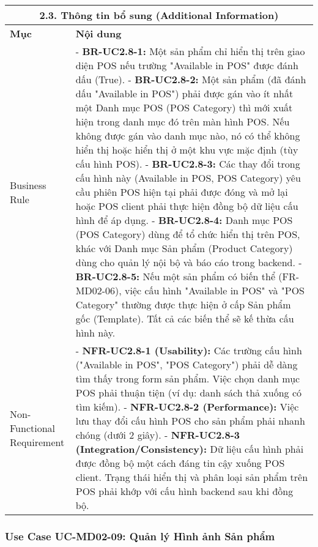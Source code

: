 \begin{longtable}{|m{4cm}|p{11cm}|}
\hline
\multicolumn{2}{|c|}{\textbf{2.3. Thông tin bổ sung (Additional Information)}} \\
\hline
\textbf{Mục} & \textbf{Nội dung} \\
\hline
Business Rule & - \textbf{BR-UC2.8-1:} Một sản phẩm chỉ hiển thị trên giao diện POS nếu trường "Available in POS" được đánh dấu (True). \newline - \textbf{BR-UC2.8-2:} Một sản phẩm (đã đánh dấu "Available in POS") phải được gán vào ít nhất một Danh mục POS (POS Category) thì mới xuất hiện trong danh mục đó trên màn hình POS. Nếu không được gán vào danh mục nào, nó có thể không hiển thị hoặc hiển thị ở một khu vực mặc định (tùy cấu hình POS). \newline - \textbf{BR-UC2.8-3:} Các thay đổi trong cấu hình này (Available in POS, POS Category) yêu cầu phiên POS hiện tại phải được đóng và mở lại hoặc POS client phải thực hiện đồng bộ dữ liệu cấu hình để áp dụng. \newline - \textbf{BR-UC2.8-4:} Danh mục POS (POS Category) dùng để tổ chức hiển thị trên POS, khác với Danh mục Sản phẩm (Product Category) dùng cho quản lý nội bộ và báo cáo trong backend. \newline - \textbf{BR-UC2.8-5:} Nếu một sản phẩm có biến thể (FR-MD02-06), việc cấu hình "Available in POS" và "POS Category" thường được thực hiện ở cấp Sản phẩm gốc (Template). Tất cả các biến thể sẽ kế thừa cấu hình này. \\
\hline
Non-Functional Requirement & - \textbf{NFR-UC2.8-1 (Usability):} Các trường cấu hình ("Available in POS", "POS Category") phải dễ dàng tìm thấy trong form sản phẩm. Việc chọn danh mục POS phải thuận tiện (ví dụ: danh sách thả xuống có tìm kiếm). \newline - \textbf{NFR-UC2.8-2 (Performance):} Việc lưu thay đổi cấu hình POS cho sản phẩm phải nhanh chóng (dưới 2 giây). \newline - \textbf{NFR-UC2.8-3 (Integration/Consistency):} Dữ liệu cấu hình phải được đồng bộ một cách đáng tin cậy xuống POS client. Trạng thái hiển thị và phân loại sản phẩm trên POS phải khớp với cấu hình backend sau khi đồng bộ. \\
\hline

\end{longtable}

\subsubsection{Use Case UC-MD02-09: Quản lý Hình ảnh Sản phẩm}

